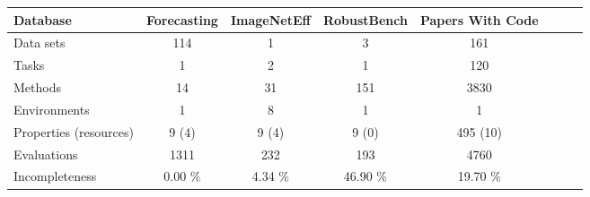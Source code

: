 
    \begin{tabular}{lccccccc}
        \toprule 
        Database & Forecasting & ImageNetEff & RobustBench & Papers With Code \\
        \midrule
        Data sets & 114 & 1 & 3 & 161 \\
        Tasks & 1 & 2 & 1 & 120 \\
        Methods & 14 & 31 & 151 & 3830 \\
        Environments & 1 & 8 & 1 & 1 \\
        Properties (resources) & 9 (4) & 9 (4) & 9 (0) & 495 (10) \\
        Evaluations & 1311 & 232 & 193 & 4760 \\
        Incompleteness &  0.00 \% &  4.34 \% & 46.90 \% & 19.70 \% \\
        \bottomrule
    \end{tabular}